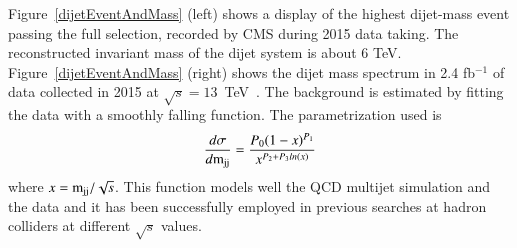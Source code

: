 \documentclass[epj]{webofc}
\begin{document}
Figure~\ref{dijetEventAndMass} (left) shows a display of the highest dijet-mass event passing the full
selection, recorded by CMS during 2015 data taking. The reconstructed invariant mass
of the dijet system is about 6 TeV. 
Figure~\ref{dijetEventAndMass} (right) shows the dijet mass spectrum in 2.4 fb$^{-1}$ of data
collected in 2015 at $\sqrt{s}=13$~TeV~\cite{Khachatryan:2015dcf}. The background is estimated
by fitting the data with a smoothly falling function. The
parametrization used is 
\begin{equation}
\frac{d\sigma}{d\rm{m}_{\rm{jj}}} = \frac{P_0 (1-x)^{P_1}}{x^{P_2+P_{3}ln(x)}}
\end{equation}
where $x=\rm{m}_{\rm{jj}} / \sqrt{s}$. 
This function models well the QCD multijet simulation and the data
and it has been successfully employed in previous searches at hadron
colliders at different $\sqrt{s}$ values.
%
\end{document}
